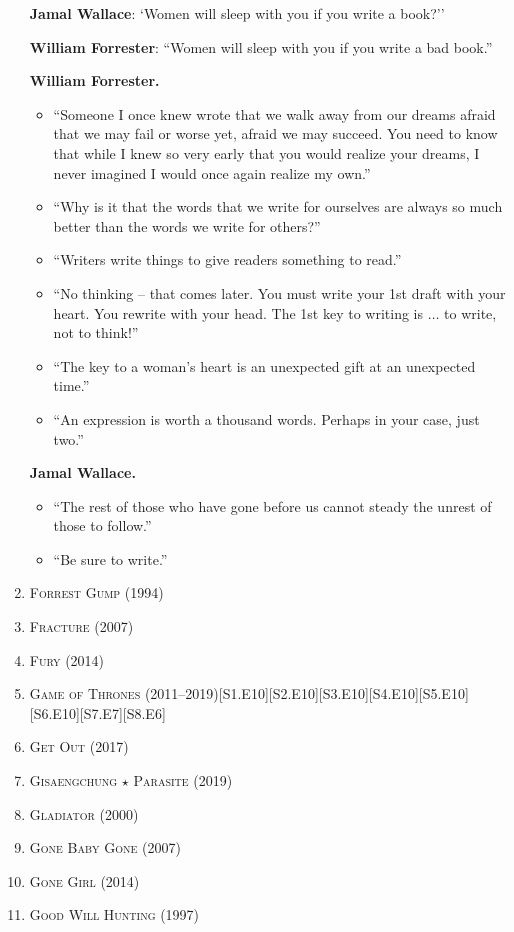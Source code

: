 \documentclass{article}
\begin{document}
\begin{enumerate}
	\textbf{Jamal Wallace}: `Women will sleep with you if you write a book?''
	
	\textbf{William Forrester}: ``Women will sleep with you if you write a bad book.''
	
	\textbf{William Forrester.}
	\begin{itemize}
		\item ``Someone I once knew wrote that we walk away from our dreams afraid that we may fail or worse yet, afraid we may succeed. You need to know that while I knew so very early that you would realize your dreams, I never imagined I would once again realize my own.''
		\item ``Why is it that the words that we write for ourselves are always so much better than the words we write for others?''
		\item ``Writers write things to give readers something to read.''
		\item ``No thinking -- that comes later. You must write your 1st draft with your heart. You rewrite with your head. The 1st key to writing is $\ldots$ to write, not to think!''
		\item ``The key to a woman's heart is an unexpected gift at an unexpected time.''
		\item ``An expression is worth a thousand words. Perhaps in your case, just two.''
	\end{itemize}	
	\textbf{Jamal Wallace.}
	\begin{itemize}
		\item ``The rest of those who have gone before us cannot steady the unrest of those to follow.''
		\item ``Be sure to write.''
	\end{itemize}
	\item \textsc{Forrest Gump} (1994)
	\item \textsc{Fracture} (2007)
	\item \textsc{Fury} (2014)
	\item \textsc{Game of Thrones} (2011--2019)\hfill[S1.E10][S2.E10][S3.E10][S4.E10][S5.E10][S6.E10][S7.E7][S8.E6]
	\item \textsc{Get Out} (2017)
	\item \textsc{Gisaengchung $\star$ Parasite} (2019)
	\item \textsc{Gladiator} (2000)
	\item \textsc{Gone Baby Gone} (2007)
	\item \textsc{Gone Girl} (2014)
	\item \textsc{Good Will Hunting} (1997)

\end{enumerate}
\end{document}
